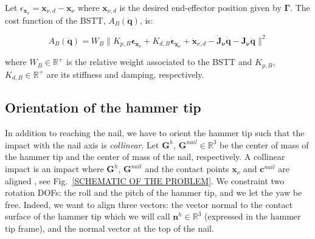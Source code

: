 \documentclass[conference]{IEEEtran}
\begin{document}
Let $\epsilon_{\mathbf{x}_\nu} = \mathbf{x}_{\nu, d} - \mathbf{x}_\nu$ where $\mathbf{x}_{\nu, d}$ is the desired end-effector position given by $\bm \Gamma$. The cost function of the BSTT, $A_{B}(\mathbf{\ddot q})$, is:
\begin{small}
    \begin{equation}
        A_{B}(\mathbf{\ddot q}) = W_{B}\| K_{p, B} \bm \epsilon_{\mathbf{x}_\nu}+ K_{d, B} \bm {\dot \epsilon_{\mathbf{x}_\nu}} + \mathbf{\ddot x}_{\nu, d} - \mathbf{\dot J_\nu \dot q} - \mathbf{J_\nu \ddot q} \|^2
    \end{equation}
\end{small}
\noindent
where $W_B \in \mathbb{R}^+$ is the relative weight associated to the BSTT and $K_{p, B}$, $K_{d, B} \in \mathbb{R}^+$ are its stiffness and damping, respectively.

\subsection{Orientation of the hammer tip}
\label{VectorOrientationTask}
\noindent
In addition to reaching the nail, we have to orient the hammer tip such that the impact with the nail axis is \textit{collinear}. Let $\mathbf{G}^{h}$, $\mathbf{G}^{nail} \in \mathbb{R}^3$ be the center of mass of the hammer tip and the center of mass of the nail, respectively. 
A collinear impact is an impact where $\mathbf{G}^h$, $\mathbf{G}^{nail}$ and the contact points $\mathbf{x}_\nu$ and $\mathbf{c}^{nail}$ are aligned \cite{STRONGE}, see Fig.~\ref{SCHEMATIC OF THE PROBLEM}. 
We constraint two rotation DOFs: the roll and the pitch of the hammer tip, and we let the yaw be free. 
Indeed, we want to align three vectors: the vector normal to the contact surface of the hammer tip which we will call $\mathbf{n}^h \in \mathbb{R}^3$ (expressed in the hammer tip frame), and the normal vector at the top of the nail. 
\end{document}
